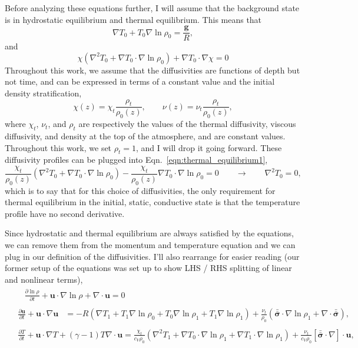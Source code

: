 \documentclass[aps, pre, onecolumn, nofootinbib, notitlepage, groupedaddress, amsfonts, amssymb, amsmath, longbibliography, superscriptaddress]{revtex4-1}
\newcommand{\grad}{\ensuremath{\nabla}}
\newcommand{\lilstressT}{\ensuremath{\bm{\bar{\bar{\sigma}}}}}
\begin{document}
Before analyzing these equations further, I will assume that the background state is in hydrostatic equilibrium and thermal equilibrium.
This means that
\begin{equation}
\grad T_0 + T_0\grad\ln\rho_0 = \frac{\bm{g}}{R},
\label{eqn:hydrostatic_equilibrium1}
\end{equation}
and
\begin{equation}
\chi (\grad^2 T_0 + \grad T_0 \cdot\grad\ln\rho_0) + \grad T_0 \cdot\grad\chi  = 0
\label{eqn:thermal_equilibrium1}
\end{equation}
Throughout this work, we assume that the diffusivities are functions of depth but not time, and can be expressed in terms of a constant value and the initial density stratification,
$$
\chi(z) = \chi_t \frac{\rho_t}{\rho_0(z)}, \qquad
\nu(z)  = \nu_t  \frac{\rho_t}{\rho_0(z)},
$$
where $\chi_t$, $\nu_t$, and $\rho_t$ are respectively the values of the thermal diffusivity, viscous diffusivity, and density at the top of the atmosphere, and are constant values.
Throughout this work, we set $\rho_t = 1$, and I will drop it going forward.
These diffusivity profiles can be plugged into Eqn.~\ref{eqn:thermal_equilibrium1},
$$
\frac{\chi_t}{\rho_0(z)}(\grad^2 T_0 + \grad T_0 \cdot \grad\ln\rho_0) - \frac{\chi_t}{\rho_0(z)}\grad T_0 \cdot\grad\ln\rho_0 = 0
\qquad\rightarrow\qquad
\grad^2 T_0 = 0,
$$
which is to say that for this choice of diffusivities, the only requirement for thermal equilibrium in the initial, static, conductive state is that the temperature profile have no second derivative.

Since hydrostatic and thermal equilibrium are always satisfied by the equations, we can remove them from the momentum and temperature equation and we can plug in our definition of the diffusivities.
I'll also rearrange for easier reading (our former setup of the equations was set up to show LHS / RHS splitting of linear and nonlinear terms),
\begin{align}
&\begin{aligned}
&\frac{\partial \ln\rho}{\partial t} + \bm{u}\cdot\grad\ln\rho + \grad\cdot\bm{u}  = 0
	\label{eqn:ab17continuity_eqn2}
\end{aligned}\\
&\begin{aligned}
\frac{\partial\bm{u}}{\partial t} + \bm{u}\cdot\grad\bm{u}
&= - R (\grad T_1 + T_1\grad\ln\rho_0 + T_0\grad\ln\rho_1 + T_1 \grad\ln\rho_1)
+ \frac{\nu_t}{\rho_0}\left(\lilstressT\cdot\grad\ln\rho_1 + \grad\cdot\lilstressT\right),
\label{eqn:ab17momentum_eqn2}
\end{aligned}\\
&\begin{aligned}
\frac{\partial T}{\partial t} + \bm{u}\cdot\grad T + (\gamma-1)T\grad\cdot\bm{u}
=	\frac{\chi_t}{c_V\rho_0}(\grad^2 T_1 + \grad T_0\cdot\grad\ln\rho_1 + \grad T_1\cdot\grad\ln\rho_1)
	+ \frac{\nu_t }{c_V\rho_0}[\lilstressT\cdot\nabla]\cdot\bm{u}, 
	\label{eqn:ab17energy_eqn2}
\end{aligned}
\end{align}
\end{document}
